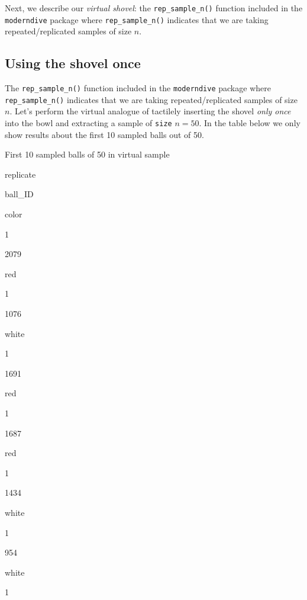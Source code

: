 \documentclass[12pt,]{krantz}
\makeatletter
\newenvironment{Shaded}{\begin{snugshade}}{\end{snugshade}}
\newcommand{\KeywordTok}[1]{\textcolor[rgb]{0.27,0.27,0.27}{\textbf{#1}}}
\newcommand{\DataTypeTok}[1]{\textcolor[rgb]{0.27,0.27,0.27}{#1}}
\newcommand{\DecValTok}[1]{\textcolor[rgb]{0.06,0.06,0.06}{#1}}
\newcommand{\StringTok}[1]{\textcolor[rgb]{0.5,0.5,0.5}{#1}}
\newcommand{\OperatorTok}[1]{\textcolor[rgb]{0.43,0.43,0.43}{\textbf{#1}}}
\newcommand{\NormalTok}[1]{#1}
\newenvironment{kframe}{%
\medskip{}
\setlength{\fboxsep}{.8em}
 \def\at@end@of@kframe{}%
 \ifinner\ifhmode%
  \def\at@end@of@kframe{\end{minipage}}%
  \begin{minipage}{\columnwidth}%
 \fi\fi%
 \def\FrameCommand##1{\hskip\@totalleftmargin \hskip-\fboxsep
 \colorbox{shadecolor}{##1}\hskip-\fboxsep
     \hskip-\linewidth \hskip-\@totalleftmargin \hskip\columnwidth}%
 \MakeFramed {\advance\hsize-\width
   \@totalleftmargin\z@ \linewidth\hsize
   \@setminipage}}%
 {\par\unskip\endMakeFramed%
 \at@end@of@kframe}
\renewenvironment{Shaded}{\begin{kframe}}{\end{kframe}}
\makeatother
\begin{document}
Next, we describe our \emph{virtual shovel}: the
\texttt{rep\_sample\_n()} function included in the \texttt{moderndive}
package where \texttt{rep\_sample\_n()} indicates that we are taking
repeated/replicated samples of size \(n\).

\subsection{Using the shovel once}\label{using-the-shovel-once-1}

The \texttt{rep\_sample\_n()} function included in the
\texttt{moderndive} package where \texttt{rep\_sample\_n()} indicates
that we are taking repeated/replicated samples of size \(n\). Let's
perform the virtual analogue of tactilely inserting the shovel
\emph{only once} into the bowl and extracting a sample of \texttt{size}
\(n=50\). In the table below we only show results about the first 10
sampled balls out of 50.

\begin{Shaded}
\end{Shaded}

\label{tab:unnamed-chunk-266}First 10 sampled balls of 50 in virtual sample

replicate

ball\_ID

color

1

2079

red

1

1076

white

1

1691

red

1

1687

red

1

1434

white

1

954

white

1
\end{document}
